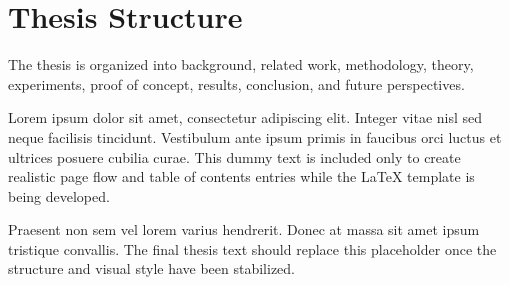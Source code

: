\section{Thesis Structure}

The thesis is organized into background, related work, methodology, theory, experiments, proof of concept, results, conclusion, and future perspectives.

Lorem ipsum dolor sit amet, consectetur adipiscing elit. Integer vitae nisl sed neque facilisis tincidunt. Vestibulum ante ipsum primis in faucibus orci luctus et ultrices posuere cubilia curae. This dummy text is included only to create realistic page flow and table of contents entries while the LaTeX template is being developed.

Praesent non sem vel lorem varius hendrerit. Donec at massa sit amet ipsum tristique convallis. The final thesis text should replace this placeholder once the structure and visual style have been stabilized.

